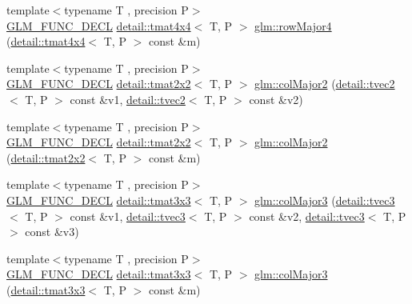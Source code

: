 \begin{DoxyCompactItemize}
\item 
{\footnotesize template$<$typename T , precision P$>$ }\\\hyperlink{setup_8hpp_ab2d052de21a70539923e9bcbf6e83a51}{G\+L\+M\+\_\+\+F\+U\+N\+C\+\_\+\+D\+E\+CL} \hyperlink{structglm_1_1detail_1_1tmat4x4}{detail\+::tmat4x4}$<$ T, P $>$ \hyperlink{group__gtx__matrix__major__storage_ga1a797d9a3f0d6b81e50b4f1bef2ed281}{glm\+::row\+Major4} (\hyperlink{structglm_1_1detail_1_1tmat4x4}{detail\+::tmat4x4}$<$ T, P $>$ const \&m)
\item 
{\footnotesize template$<$typename T , precision P$>$ }\\\hyperlink{setup_8hpp_ab2d052de21a70539923e9bcbf6e83a51}{G\+L\+M\+\_\+\+F\+U\+N\+C\+\_\+\+D\+E\+CL} \hyperlink{structglm_1_1detail_1_1tmat2x2}{detail\+::tmat2x2}$<$ T, P $>$ \hyperlink{group__gtx__matrix__major__storage_gae53863d1ced5629d5aa3ce04abf14ab1}{glm\+::col\+Major2} (\hyperlink{structglm_1_1detail_1_1tvec2}{detail\+::tvec2}$<$ T, P $>$ const \&v1, \hyperlink{structglm_1_1detail_1_1tvec2}{detail\+::tvec2}$<$ T, P $>$ const \&v2)
\item 
{\footnotesize template$<$typename T , precision P$>$ }\\\hyperlink{setup_8hpp_ab2d052de21a70539923e9bcbf6e83a51}{G\+L\+M\+\_\+\+F\+U\+N\+C\+\_\+\+D\+E\+CL} \hyperlink{structglm_1_1detail_1_1tmat2x2}{detail\+::tmat2x2}$<$ T, P $>$ \hyperlink{group__gtx__matrix__major__storage_ga84d93f2dea8fd341232f0505038d50f6}{glm\+::col\+Major2} (\hyperlink{structglm_1_1detail_1_1tmat2x2}{detail\+::tmat2x2}$<$ T, P $>$ const \&m)
\item 
{\footnotesize template$<$typename T , precision P$>$ }\\\hyperlink{setup_8hpp_ab2d052de21a70539923e9bcbf6e83a51}{G\+L\+M\+\_\+\+F\+U\+N\+C\+\_\+\+D\+E\+CL} \hyperlink{structglm_1_1detail_1_1tmat3x3}{detail\+::tmat3x3}$<$ T, P $>$ \hyperlink{group__gtx__matrix__major__storage_ga8bc9dc6fcd7017b7123a151d9f251013}{glm\+::col\+Major3} (\hyperlink{structglm_1_1detail_1_1tvec3}{detail\+::tvec3}$<$ T, P $>$ const \&v1, \hyperlink{structglm_1_1detail_1_1tvec3}{detail\+::tvec3}$<$ T, P $>$ const \&v2, \hyperlink{structglm_1_1detail_1_1tvec3}{detail\+::tvec3}$<$ T, P $>$ const \&v3)
\item 
{\footnotesize template$<$typename T , precision P$>$ }\\\hyperlink{setup_8hpp_ab2d052de21a70539923e9bcbf6e83a51}{G\+L\+M\+\_\+\+F\+U\+N\+C\+\_\+\+D\+E\+CL} \hyperlink{structglm_1_1detail_1_1tmat3x3}{detail\+::tmat3x3}$<$ T, P $>$ \hyperlink{group__gtx__matrix__major__storage_ga40caccd20b8afb6de68c626efc376927}{glm\+::col\+Major3} (\hyperlink{structglm_1_1detail_1_1tmat3x3}{detail\+::tmat3x3}$<$ T, P $>$ const \&m)

\end{DoxyCompactItemize}
